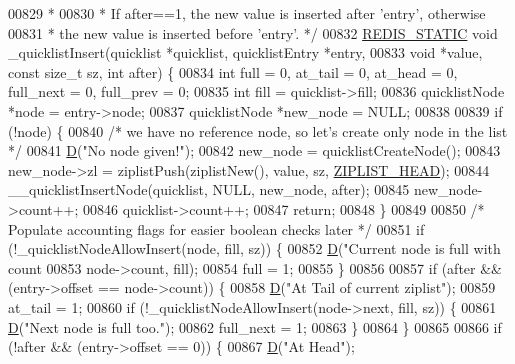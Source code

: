 \begin{DoxyCode}
{{{{00829 \textcolor{comment}{ *}
00830 \textcolor{comment}{ * If after==1, the new value is inserted after 'entry', otherwise}
00831 \textcolor{comment}{ * the new value is inserted before 'entry'. */}
00832 \hyperlink{quicklist_8c_a9c22c9c899458021930a552a4f94d317}{REDIS\_STATIC} \textcolor{keywordtype}{void} \_quicklistInsert(quicklist *quicklist, quicklistEntry *entry,
00833                                    \textcolor{keywordtype}{void} *value, \textcolor{keyword}{const} size\_t sz, \textcolor{keywordtype}{int} after) \{
00834     \textcolor{keywordtype}{int} full = 0, at\_tail = 0, at\_head = 0, full\_next = 0, full\_prev = 0;
00835     \textcolor{keywordtype}{int} fill = quicklist->fill;
00836     quicklistNode *node = entry->node;
00837     quicklistNode *new\_node = NULL;
00838 
00839     \textcolor{keywordflow}{if} (!node) \{
00840         \textcolor{comment}{/* we have no reference node, so let's create only node in the list */}
00841         \hyperlink{debugmacro_8h_a74021f021dcdfbb22891787b79c5529d}{D}(\textcolor{stringliteral}{"No node given!"});
00842         new\_node = quicklistCreateNode();
00843         new\_node->zl = ziplistPush(ziplistNew(), value, sz, \hyperlink{ziplist_8h_a88d32e547c509220e1c50cd9306186ba}{ZIPLIST\_HEAD});
00844         \_\_quicklistInsertNode(quicklist, NULL, new\_node, after);
00845         new\_node->count++;
00846         quicklist->count++;
00847         \textcolor{keywordflow}{return};
00848     \}
00849 
00850     \textcolor{comment}{/* Populate accounting flags for easier boolean checks later */}
00851     \textcolor{keywordflow}{if} (!\_quicklistNodeAllowInsert(node, fill, sz)) \{
00852         \hyperlink{debugmacro_8h_a74021f021dcdfbb22891787b79c5529d}{D}(\textcolor{stringliteral}{"Current node is full with count %
00853           node->count, fill);
00854         full = 1;
00855     \}
00856 
00857     \textcolor{keywordflow}{if} (after && (entry->offset == node->count)) \{
00858         \hyperlink{debugmacro_8h_a74021f021dcdfbb22891787b79c5529d}{D}(\textcolor{stringliteral}{"At Tail of current ziplist"});
00859         at\_tail = 1;
00860         \textcolor{keywordflow}{if} (!\_quicklistNodeAllowInsert(node->next, fill, sz)) \{
00861             \hyperlink{debugmacro_8h_a74021f021dcdfbb22891787b79c5529d}{D}(\textcolor{stringliteral}{"Next node is full too."});
00862             full\_next = 1;
00863         \}
00864     \}
00865 
00866     \textcolor{keywordflow}{if} (!after && (entry->offset == 0)) \{
00867         \hyperlink{debugmacro_8h_a74021f021dcdfbb22891787b79c5529d}{D}(\textcolor{stringliteral}{"At Head"});
}}}}}
\end{DoxyCode}
